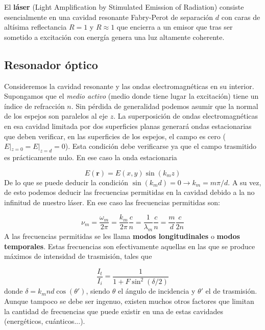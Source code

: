 \documentclass[12pt,a4paper]{book}
\numberwithin{equation}{section}
\numberwithin{figure}{section}
\newcommand{\1}{_{(1)}}
\newcommand{\2}{_{(2)}}
\newcommand{\rn}{\mathbf{r}}
\theoremstyle{definition}
\begin{document}
El \textbf{láser} (Light Amplification by Stimulated Emission of Radiation) consiste esencialmente en una cavidad resonante Fabry-Perot de separación $d$ con caras de altísima reflectancia $R=1$ y $R\approx1$ que encierra a un emisor que tras ser sometido a excitación con energía genera una luz altamente coherente. 

\subsection{Resonador óptico}

Consideremos la cavidad resonante y las ondas electromagnéticas en su interior. Supongamos que el \textit{medio activo} (medio donde tiene lugar la excitación) tiene un índice de refracción $n$. Sin pérdida de generalidad podemos asumir que la normal de los espejos son paralelos al eje $z$. La superposición de ondas electromagnéticas en esa cavidad limitada por dos superficies planas generará ondas estacionarias que deben verificar, en las superficies de los espejos, el campo es cero ($E|_{z=0}=E|_{z=d}=0$). Esta condición debe verificarse ya que el campo trasmitido es prácticamente nulo. En ese caso la onda estacionaria 

\begin{equation}
E(\rn) = E(x,y) \sin (k_m z)
\end{equation}
De lo que se puede deducir la condición $\sin(k_md)=0\longrightarrow k_m=m\pi/d$. A su vez, de esto podemos deducir las frecuencias permitidas en la cavidad debido a la no infinitud de nuestro láser. En ese caso las frecuencias permitidas son:

\begin{equation}
\nu_m = \frac{\omega_m}{2 \pi} = \frac{k_m}{2 \pi} \frac{c}{n} = \frac{1}{\lambda_m} \frac{c}{n} = \frac{m}{d}\frac{c}{2n}
\end{equation}
A las frecuencias permitidas se les llama \textbf{modos longitudinales} o \textbf{modos temporales}. Estas frecuencias son efectivamente aquellas en las que se produce máximos de intensidad de trasmisión, tales que

\begin{equation}
\frac{I_t}{I_i} = \frac{1}{1+F \sin^2 (\delta/2)}
\end{equation}
donde $\delta=k_mnd\cos (\theta')$, siendo $\theta$ el ángulo de incidencia y $\theta'$ el de trasmisión. Aunque tampoco se debe ser ingenuo, existen muchos otros factores que limitan la cantidad de frecuencias que puede existir en una de estas cavidades (energéticos, cuánticos...). \\
\end{document}
